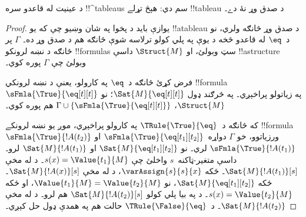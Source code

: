 \documentclass[../../../include/open-logic-section]{subfiles}
\begin{document}


\begin{prop}
د عينيت له قاعدو سره !!^{tableau}s سم دي: هېڅ تړلے !!{tableau}
د صدق وړ نۀ دے۔
\end{prop}

\begin{proof}
يوازې بايد د پخوا په شان وښيو چې که يو !!a{tableau} د صدق وړ
څانګه ولري، نو د~$\eq$ له قاعدو څخه د يوې په پلي کولو ترلاسه شوې
څانګه هم د صدق وړ ده۔ $\Gamma$ پر څانګه د نښه لرونکو !!{formula}s
سټ وبولئ، او $\Struct{M}$ داسې !!a{structure} وبولئ چې $\Gamma$
پوره کوي۔

فرض کړئ څانګه د~$\eq$ په کارولو، يعنې د نښه لرونکي
!!{formula}~$\sFmla{\True}{\eq[t][t]}$ په زياتولو پراخېږي۔ په
څرګند ډول $\Sat{M}{\eq[t][t]}$؛ نو $\Struct{M}$،
$\Gamma \cup \{\sFmla{\True}{\eq[t][t]}\}$ هم پوره کوي۔

که څانګه د~$\TRule{\True}{\eq}$ په کارولو پراخېږي، موږ يو نښه
لرونکے !!{formula}~$\sFmla{\True}{!A(t_2)}$ ورزياتوو، خو $\Gamma$
دواړه~$\sFmla{\True}{\eq[t_1][t_2]}$ او
$\sFmla{\True}{!A(t_1)}$ لري۔
نو $\Sat{M}{\eq[t_1][t_2]}$ او $\Sat{M}{!A(t_1)}$ لرو۔ داسې
متغير-ټاکنه~$s$ واخلئ چې $s(x) = \Value{t_1}{M}$۔ د
 له مخې
$\Sat{M}{!A(t_1)}[s]$۔ ځکه $\varAssign{s}{s}{x}$، د
 له مخې $\Sat{M}{!A(x)}[s]$۔
ځکه $\Sat{M}{\eq[t_1][t_2]}$، نو
$\Value{t_1}{M} = \Value{t_2}{M}$، او ځکه
$s(x) = \Value{t_2}{M}$۔ د
 په بيا پلي کولو
$\Sat{M}{!A(t_2)}[s]$ هم لرو۔ د
 له مخې
$\Sat{M}{!A(t_2)}$۔ د~$\TRule{\False}{\eq}$ حالت هم په همدې ډول
حل کېږي۔
\end{proof}
\end{document}
